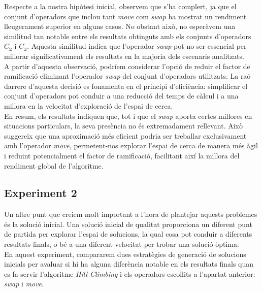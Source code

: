 \documentclass[a4paper]{article}
\begin{document}
	Respecte a la nostra hipòtesi inicial, observem que s'ha complert, ja que el conjunt d'operadors que inclou tant \textit{move} com \textit{swap} ha mostrat un rendiment lleugerament superior en alguns casos. No obstant això, no esperàvem una similitud tan notable entre els resultats obtinguts amb els conjunts d'operadors $C_{\texttt{2}}$ i $C_{\texttt{3}}$. Aquesta similitud indica que l'operador \textit{swap} pot no ser essencial per millorar significativament els resultats en la majoria dels escenaris analitzats. \\
	
	A partir d'aquesta observació, podríem considerar l'opció de reduir el factor de ramificació eliminant l'operador \textit{swap} del conjunt d'operadors utilitzats. La raó darrere d'aquesta decisió es fonamenta en el principi d'eficiència: simplificar el conjunt d'operadors pot conduir a una reducció del temps de càlcul i a una millora en la velocitat d'exploració de l'espai de cerca. \\
	
	En resum, els resultats indiquen que, tot i que el \textit{swap} aporta certes millores en situacions particulars, la seva presència no és extremadament rellevant. Això suggereix que una aproximació més eficient podria ser treballar exclusivament amb l'operador \textit{move}, permetent-nos explorar l'espai de cerca de manera més àgil i reduint potencialment el factor de ramificació, facilitant així la millora del rendiment global de l'algoritme. \\
	
	
	\subsection{Experiment 2}
	
	Un altre punt que creiem molt important a l'hora de plantejar aquests problemes és la solució inicial. Una solució inicial de qualitat proporciona un diferent punt de partida per explorar l'espai de solucions, la qual cosa pot conduir a diferents resultats finals, o bé a una diferent velocitat per trobar una solució òptima. \\
	
	En aquest experiment, compararem dues estratègies de generació de solucions inicials per avaluar si hi ha alguna diferència notable en els resultats finals quan es fa servir l'algoritme \textit{Hill Climbing} i els operadors escollits a l'apartat anterior: \textit{swap} i \textit{move}.\\
	
\end{document}
